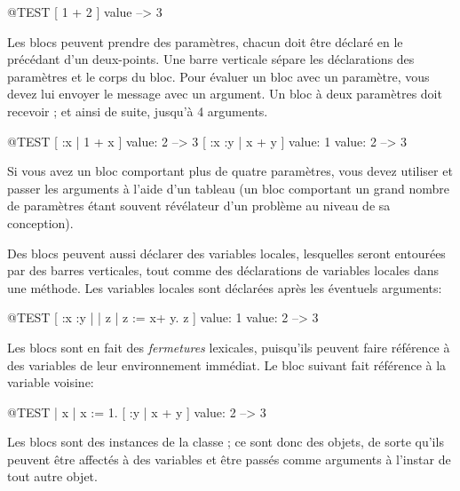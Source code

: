 \documentclass[a4paper,10pt,twoside]{book}
\begin{document}
\begin{code}{@TEST}
[ 1 + 2 ] value --> 3
\end{code}

Les blocs peuvent prendre des param\`etres, chacun doit \^etre
d\'eclar\'e en le précédant d'un deux-points.
Une barre verticale s\'{e}pare les d\'{e}clarations des param\`{e}tres
et le corps du bloc.
Pour \'evaluer un bloc avec un param\`{e}tre, vous devez lui envoyer le message 
  avec un argument.
Un bloc \`{a} deux param\`etres doit recevoir  ; et ainsi de suite, jusqu'\`a 4 arguments.

\begin{code}{@TEST}
[ :x | 1 + x ] value: 2 --> 3
[ :x :y | x + y ] value: 1 value: 2 --> 3
\end{code}

Si vous avez un bloc comportant plus de quatre param\`{e}tres, vous devez utiliser
 et passer les arguments à
l'aide d'un tableau (un bloc comportant un grand nombre de param\`{e}tres étant souvent r\'{e}v\'{e}lateur d'un probl\`{e}me au niveau de sa conception).

Des blocs peuvent aussi d\'{e}clarer des variables locales, lesquelles seront entour\'{e}es par des barres verticales, tout comme des d\'{e}clarations de variables locales dans une m\'{e}thode.
Les variables locales sont d\'{e}clar\'{e}es apr\`{e}s les éventuels
arguments:

\begin{code}{@TEST}
[ :x :y | | z | z := x+ y. z ] value: 1 value: 2 --> 3
\end{code}

Les blocs sont en fait des \emph{fermetures} lexicales, puisqu'ils
peuvent faire r\'ef\'erence \`a des variables de leur environnement
imm\'ediat. Le bloc suivant fait r\'ef\'erence \`a la variable  voisine:
\newpage
\begin{code}{@TEST}
| x |
x := 1.
[ :y | x + y ] value: 2 --> 3
\end{code}

Les blocs sont des instances de la classe ; ce
sont donc des objets, de sorte qu'ils peuvent \^{e}tre affect\'{e}s
\`{a} des variables et \^{e}tre pass\'{e}s comme arguments \`{a}
l'instar de tout autre objet.
\end{document}
